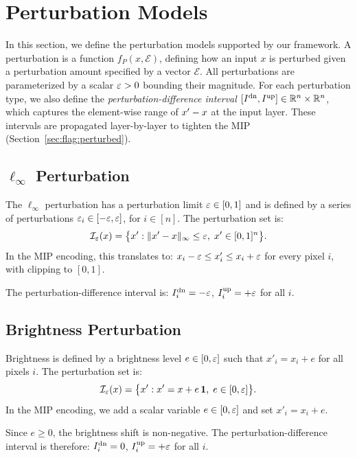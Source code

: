 \section{Perturbation Models}
\label{sec:perturbations}

In this section, we define the perturbation models supported by our framework. A perturbation is a function $f_P(x, \mathcal{E})$, defining how an input $x$ is perturbed given a perturbation amount specified by a vector $\mathcal{E}$. All perturbations are parameterized by a scalar $\varepsilon > 0$ bounding their magnitude. For each perturbation type, we also define the \emph{perturbation-difference interval} $[I^{\mathrm{dn}}, I^{\mathrm{up}}] \in \mathbb{R}^n \times \mathbb{R}^n$, which captures the element-wise range of $x' - x$ at the input layer. These intervals are propagated layer-by-layer to tighten the MIP (Section~\ref{sec:flag:perturbed}).

\subsection{\texorpdfstring{$\ell_\infty$}{L-inf} Perturbation}

The $\ell_\infty$ perturbation has a perturbation limit $\varepsilon \in [0,1]$ and is defined by a series of perturbations $\varepsilon_{i} \in [-\varepsilon, \varepsilon]$, for $i \in [n]$. The perturbation set is:
\[
  \mathcal{I}_\varepsilon(x) = \bigl\{x' : \|x' - x\|_\infty \le \varepsilon,\;
  x' \in [0,1]^n\bigr\}.
\]
In the MIP encoding, this translates to: $x_i - \varepsilon \le x'_i \le x_i + \varepsilon$ for every pixel $i$, with clipping to $[0,1]$.

The perturbation-difference interval is:
$I^{\mathrm{dn}}_i = -\varepsilon$, $I^{\mathrm{up}}_i = +\varepsilon$ for all $i$.

\subsection{Brightness Perturbation}

Brightness is defined by a brightness level $e \in [0, \varepsilon]$ such that $x'_i = x_i + e$ for all pixels $i$. The perturbation set is:
\[
  \mathcal{I}_\varepsilon(x) = \bigl\{x' : x' = x + e\,\mathbf{1},\; e \in [0, \varepsilon]\bigr\}.
\]
In the MIP encoding, we add a scalar variable $e \in [0, \varepsilon]$ and set $x'_i = x_i + e$.

Since $e \ge 0$, the brightness shift is non-negative. The perturbation-difference interval is therefore: $I^{\mathrm{dn}}_i = 0$, $I^{\mathrm{up}}_i = +\varepsilon$ for all $i$.

